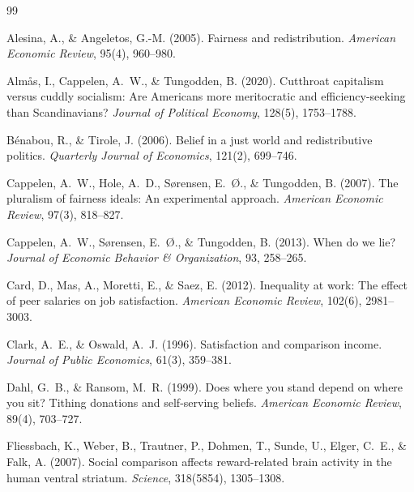 \documentclass[12pt]{article}
\begin{document}

\begin{thebibliography}{99}

Alesina, A., \& Angeletos, G.-M. (2005).
Fairness and redistribution.
\textit{American Economic Review}, 95(4), 960--980.

Alm{\aa}s, I., Cappelen, A.~W., \& Tungodden, B. (2020).
Cutthroat capitalism versus cuddly socialism: Are Americans more meritocratic and efficiency-seeking than Scandinavians?
\textit{Journal of Political Economy}, 128(5), 1753--1788.

B{\'e}nabou, R., \& Tirole, J. (2006).
Belief in a just world and redistributive politics.
\textit{Quarterly Journal of Economics}, 121(2), 699--746.

Cappelen, A.~W., Hole, A.~D., S{\o}rensen, E.~{\O}., \& Tungodden, B. (2007).
The pluralism of fairness ideals: An experimental approach.
\textit{American Economic Review}, 97(3), 818--827.

Cappelen, A.~W., S{\o}rensen, E.~{\O}., \& Tungodden, B. (2013).
When do we lie?
\textit{Journal of Economic Behavior \& Organization}, 93, 258--265.

Card, D., Mas, A., Moretti, E., \& Saez, E. (2012).
Inequality at work: The effect of peer salaries on job satisfaction.
\textit{American Economic Review}, 102(6), 2981--3003.

Clark, A.~E., \& Oswald, A.~J. (1996).
Satisfaction and comparison income.
\textit{Journal of Public Economics}, 61(3), 359--381.

Dahl, G.~B., \& Ransom, M.~R. (1999).
Does where you stand depend on where you sit? Tithing donations and self-serving beliefs.
\textit{American Economic Review}, 89(4), 703--727.

Fliessbach, K., Weber, B., Trautner, P., Dohmen, T., Sunde, U., Elger, C.~E., \& Falk, A. (2007).
Social comparison affects reward-related brain activity in the human ventral striatum.
\textit{Science}, 318(5854), 1305--1308.


\end{thebibliography}
\end{document}
